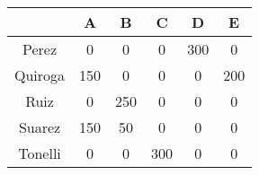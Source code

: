     \begin{tabular}{cccccc}
            & A       & B       & C       & D       & E \bigstrut[b]\\
    \hline
    \hline
    Perez   & 0       & 0       & 0       & 300     & 0 \bigstrut[t]\\
    Quiroga & 150     & 0       & 0       & 0       & 200 \\
    Ruiz    & 0       & 250     & 0       & 0       & 0 \\
    Suarez  & 150     & 50      & 0       & 0       & 0 \\
    Tonelli & 0       & 0       & 300     & 0       & 0 \bigstrut[b]\\
    \hline
    \hline
    \end{tabular}%
